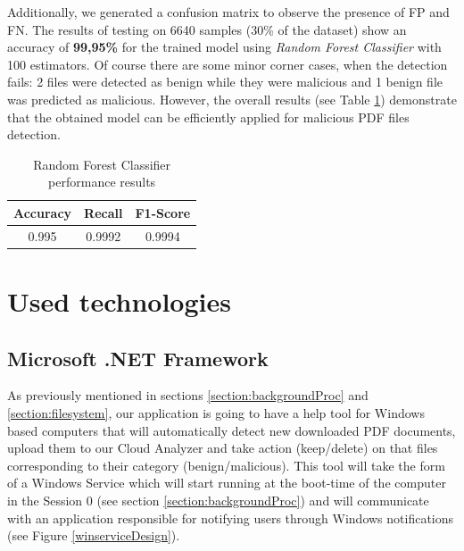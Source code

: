 Additionally, we generated a confusion matrix to observe the presence of FP and FN. The results of testing on 6640 samples (30\% of the dataset) show an accuracy of \textbf{99,95\%} for the trained model using \textit{Random Forest Classifier} with 100 estimators. Of course there are some minor corner cases, when the detection fails: 2 files were detected as benign while they were malicious and 1 benign file was predicted as malicious. However, the overall results (see Table \ref{table:results}) demonstrate that the obtained model can be efficiently applied for malicious PDF files detection.

\begin{table}[H]
	\caption{Random Forest Classifier performance results}
	\label{table:results}
        \centering
            \begin{tabular}{c c c}
                \toprule
                
				\textbf{Accuracy} & \textbf{Recall} & \textbf{F1-Score} \\
				\hline 
                0.995 & 0.9992 & 0.9994 \\
                
                \bottomrule
			\end{tabular}
\end{table}


\newpage

\section{Used technologies}
\label{section:technologies}
\subsection{Microsoft .NET Framework}
As previously mentioned in sections \ref{section:backgroundProc} and \ref{section:filesystem}, our application is going to have a help tool for Windows based computers that will automatically detect new downloaded PDF documents, upload them to our Cloud Analyzer and take action (keep/delete) on that files corresponding to their category (benign/malicious). This tool will take the form of a Windows Service which will start running at the boot-time of the computer in the Session 0 (see section \ref{section:backgroundProc}) and will communicate with an application responsible for notifying users through Windows notifications (see Figure \ref{winserviceDesign}). 

